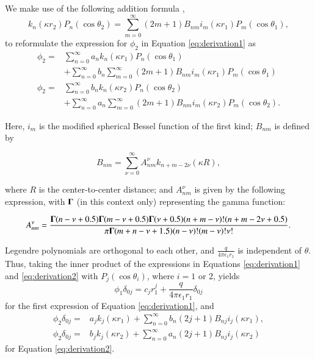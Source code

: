 We make use of the following addition formula \cite{MarceljaMitchellNinhamSculley1977},
%
\begin{equation} \label{eq:addition_formula}
k_n(\kappa r_2) P_n(\cos \theta_2) = \sum_{m=0}^{\infty}(2m+1) B_{nm} i_m(\kappa r_1) P_m(\cos \theta_1),
\end{equation}
%
\noindent to reformulate the expression for $\phi_2$ in Equation \eqref{eq:derivation1} as 
%
\begin{align} \label{eq:derivation2}
\phi_2 =& \sum_{n=0}^{\infty} a_n k_n(\kappa r_1) P_n(\cos \theta_1) \nonumber \\
& + \sum_{n=0}^{\infty} b_n \sum_{m=0}^{\infty}(2m+1) B_{nm} i_m(\kappa r_1) P_m(\cos \theta_1) \nonumber \\ 
\phi_2 =& \sum_{n=0}^{\infty} b_n k_n(\kappa r_2) P_n(\cos \theta_2) \nonumber \\
& + \sum_{n=0}^{\infty} a_n \sum_{m=0}^{\infty}(2m+1) B_{nm} i_m(\kappa r_2) P_m(\cos \theta_2).
\end{align}

Here, $i_m$ is the modified spherical Bessel function of the first kind; $B_{nm}$ is defined by 

\begin{equation} \label{eq:Bnm}
B_{nm} = \sum_{\nu=0}^{\infty} A_{nm}^{\nu} k_{n+m-2\nu}(\kappa R),
\end{equation}

\noindent where $R$ is the center-to-center distance; and $A_{nm}^{\nu}$ is given by the following expression, with ${\bf \Gamma}$ (in this context only) representing the gamma function:

\begin{equation} \label{eq:Anm}
A_{nm}^{\nu} = \frac{{\bf \Gamma}(n-\nu+0.5){\bf \Gamma}(m-\nu+0.5){\bf \Gamma}(\nu+0.5)(n+m-\nu)!(n+m-2\nu+0.5)}{\pi {\bf \Gamma}(m+n-\nu+1.5)(n-\nu)!(m-\nu)!\nu!}.
\end{equation}



Legendre polynomials are orthogonal to each other, and $\frac{q}{4\pi\epsilon_1 r_1}$ is independent of $\theta$. Thus, taking the inner product of the expressions in Equations \eqref{eq:derivation1} and  \eqref{eq:derivation2} with $P_j(\cos \theta_i)$, where $i=1$ or $2$, yields
%
\begin{equation} \label{eq:derivation3}
\phi_1\delta_{0j} = c_j r_1^j + \frac{q}{4\pi\epsilon_1 r_1} \delta_{0j}  
\end{equation}
\noindent for the first expression of Equation \eqref{eq:derivation1}, and
%
\begin{align} \label{eq:derivation3.5}
\phi_2\delta_{0j} = &a_j k_j(\kappa r_1) + \sum_{n=0}^{\infty} b_n(2j+1)B_{nj} i_j(\kappa r_1),  \nonumber \\
\phi_2\delta_{0j} = &b_j k_j(\kappa r_2) + \sum_{n=0}^{\infty} a_n(2j+1)B_{nj} i_j(\kappa r_2)  
\end{align}
\noindent for Equation \eqref{eq:derivation2}.

